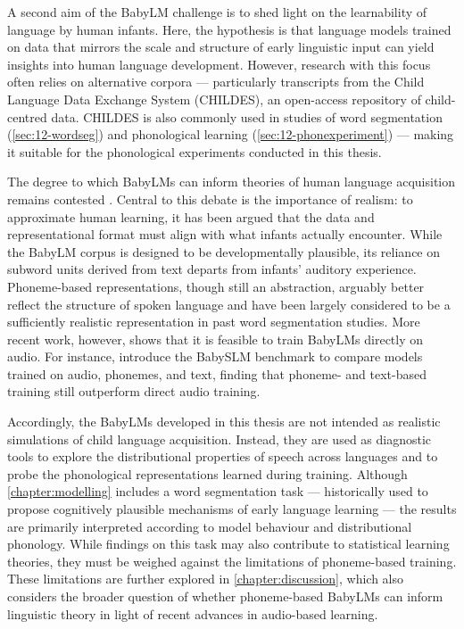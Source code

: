 A second aim of the BabyLM challenge is to shed light on the learnability of language by human infants. Here, the hypothesis is that language models trained on data that mirrors the scale and structure of early linguistic input can yield insights into human language development. However, research with this focus often relies on alternative corpora --- particularly transcripts from the Child Language Data Exchange System (CHILDES), an open-access repository of child-centred data. CHILDES is also commonly used in studies of word segmentation (\cref{sec:12-wordseg}) and phonological learning (\cref{sec:12-phonexperiment}) --- making it suitable for the phonological experiments conducted in this thesis.

The degree to which BabyLMs can inform theories of human language acquisition remains contested \citep{dupoux-2018-cognitive,baroni-2022-proper,warstadt-2022-artificial,beinborn2024cognitive,wilcox2025bigger,salhancopil2025}. Central to this debate is the importance of realism: to approximate human learning, it has been argued that the data and representational format must align with what infants actually encounter. While the BabyLM corpus is designed to be developmentally plausible, its reliance on subword units derived from text departs from infants' auditory experience. Phoneme-based representations, though still an abstraction, arguably better reflect the structure of spoken language and have been largely considered to be a sufficiently realistic representation in past word segmentation studies. More recent work, however, shows that it is feasible to train BabyLMs directly on audio. For instance, \citet{lavechin} introduce the BabySLM benchmark to compare models trained on audio, phonemes, and text, finding that phoneme- and text-based training still outperform direct audio training. %


Accordingly, the BabyLMs developed in this thesis are not intended as realistic simulations of child language acquisition. Instead, they are used as diagnostic tools to explore the distributional properties of speech across languages and to probe the phonological representations learned during training. Although \cref{chapter:modelling} includes a word segmentation task --- historically used to propose cognitively plausible mechanisms of early language learning --- the results are primarily interpreted according to model behaviour and distributional phonology. While findings on this task may also contribute to statistical learning theories, they must be weighed against the limitations of phoneme-based training. These limitations are further explored in \cref{chapter:discussion}, which also considers the broader question of whether phoneme-based BabyLMs can inform linguistic theory in light of recent advances in audio-based learning.

